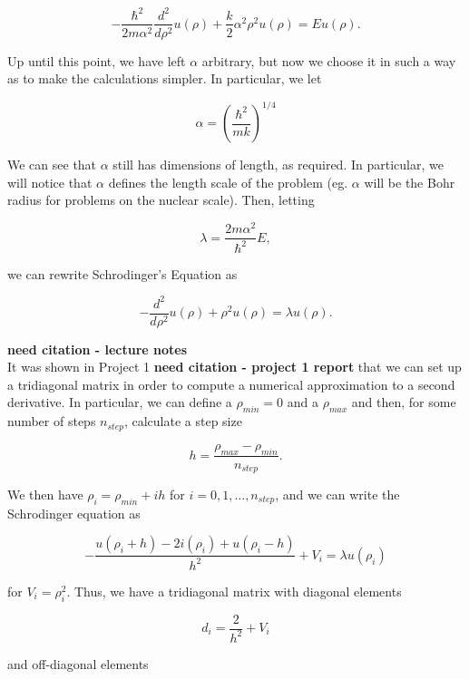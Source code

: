 \documentclass[12pt]{article}
\numberwithin{equation}{section}
\begin{document}
$$-\frac{\hbar^{2}}{2m\alpha^{2}}\frac{d^{2}}{d\rho^{2}}u\left(\rho\right)+\frac{k}{2}\alpha^{2}\rho^{2}u\left(\rho\right)=Eu\left(\rho\right).$$

\indent Up until this point, we have left $\alpha$ arbitrary, but now we choose it in such a way as to make the calculations simpler.  In particular, we let 

\begin{equation}
\label{eq:alpha}
\alpha=\left(\frac{\hbar^{2}}{mk}\right)^{1/4}
\end{equation}

\noindent We can see that $\alpha$ still has dimensions of length, as required.  In particular, we will notice that $\alpha$ defines the length scale of the problem (eg. $\alpha$ will be the Bohr radius for problems on the nuclear scale).  Then, letting

$$\lambda=\frac{2m\alpha^{2}}{\hbar^{2}}E,$$

\noindent we can rewrite Schrodinger's Equation as

\begin{equation}
\label{eq:schrodfinal}
-\frac{d^{2}}{d\rho^{2}}u\left(\rho\right)+\rho^{2}u\left(\rho\right)=\lambda u\left(\rho\right).
\end{equation}

\noindent\textbf{need citation - lecture notes}  
\\\indent It was shown in Project 1 \textbf{need citation - project 1 report} that we can set up a tridiagonal matrix in order to compute a numerical approximation to a second derivative.  In particular, we can define a $\rho_{min}=0$ and a $\rho_{max}$ and then, for some number of steps $n_{step}$, calculate a step size

$$h=\frac{\rho_{max}-\rho_{min}}{n_{step}}.$$

\noindent We then have $\rho_{i}=\rho_{min}+ih$ for $i=0,1,\ldots,n_{step}$, and we can write the Schrodinger equation as

\begin{equation}
\label{eq:schrodapprox}
-\frac{u\left(\rho_{i}+h\right)-2i\left(\rho_{i}\right)+u\left(\rho_{i}-h\right)}{h^{2}}+V_{i}=\lambda u\left(\rho_{i}\right)
\end{equation}

\noindent for $V_{i}=\rho_{i}^{2}$.  Thus, we have a tridiagonal matrix with diagonal elements

$$d_{i}=\frac{2}{h^{2}}+V_{i}$$

\noindent and off-diagonal elements
\end{document}
